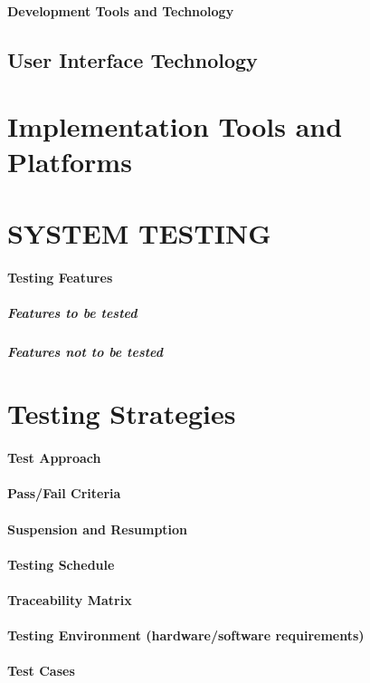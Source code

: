 \documentclass{article}
\begin{document}
\paragraph{Development Tools and Technology}
\subsection{User Interface Technology}
\section{Implementation Tools and Platforms}

\newpage
\section{SYSTEM TESTING}
\paragraph{Testing Features}
\subparagraph{Features to be tested}
\subparagraph{Features not to be tested}
\section{Testing Strategies}
\paragraph{Test Approach}
\paragraph{Pass/Fail Criteria}
\paragraph{Suspension and Resumption}
\paragraph{Testing Schedule}
\paragraph{Traceability Matrix}
\paragraph{Testing Environment (hardware/software requirements)}
\paragraph{Test Cases}
\end{document}
